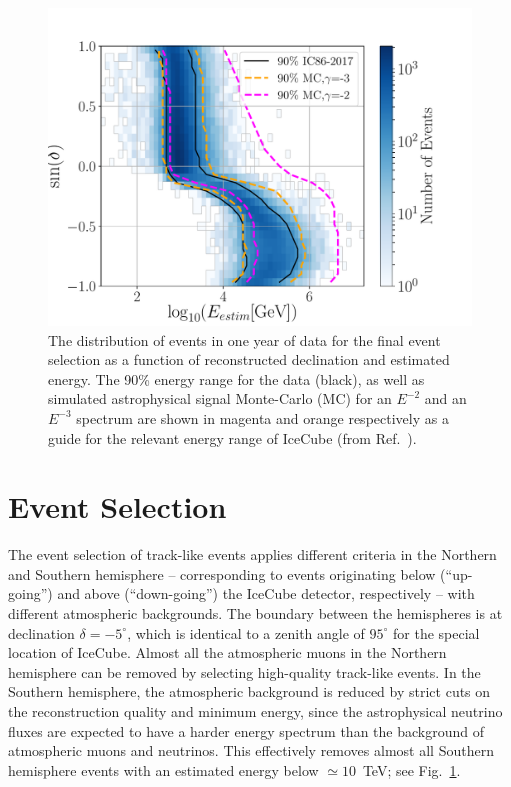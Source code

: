 \documentclass[aps,10pt,prd,twocolumn,floats,letterpaper,showpacs,nofootinbib,bibnotes,notitlepage,superscriptaddress,floatfix]{revtex4-1}
\begin{document}
\begin{figure}[t]
\centering
\includegraphics[width=\linewidth,viewport= 0 0 530 390, clip=true]{IC86II_enDist.pdf}
\caption[]{The distribution of events in one year of data for the final event selection as a function of reconstructed declination and estimated energy. The 90\% energy range for the data (black), as well as simulated astrophysical signal Monte-Carlo (MC) for an $E^{-2}$ and an $E^{-3}$ spectrum are shown in magenta and orange respectively as a guide for the relevant energy range of IceCube (from Ref.~\cite{Aartsen:2019fau}).}\label{fig:enDist}
\end{figure}

\section{Event Selection}\label{secII}

The event selection of track-like events applies different criteria in the Northern and Southern hemisphere -- corresponding to events originating below (``up-going'') and above (``down-going'') the IceCube detector, respectively -- with different atmospheric backgrounds. The boundary between the hemispheres is at declination $\delta=-5^\circ$, which is identical to a zenith angle of $95^\circ$ for the special location of IceCube. Almost all the atmospheric muons in the Northern hemisphere can be removed by selecting high-quality track-like events. In the Southern hemisphere, the atmospheric background is reduced by strict cuts on the reconstruction quality and minimum energy, since the astrophysical neutrino fluxes are expected to have a harder energy spectrum than the background of atmospheric muons and neutrinos. This effectively removes almost all Southern hemisphere events with an estimated energy below $\simeq10$~TeV; see Fig.~\ref{fig:enDist}. 
\end{document}
